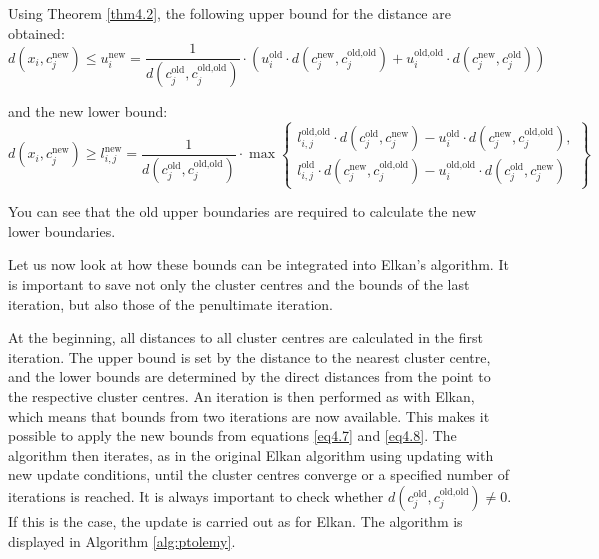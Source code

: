 Using Theorem \ref{thm4.2}, the following upper bound for the distance are obtained:
\begin{equation}
\label{eq4.7}
    d(x_i, c_j^{\text{new}}) \leq u_i^{\text{new}} = \frac{1}{d(c_j^{\text{old}}, c_j^{\text{old,old}})} \cdot \left( u_i^{\text{old}} \cdot d(c_j^{\text{new}}, c_j^{\text{old,old}}) + u_i^{\text{old,old}} \cdot d(c_j^{\text{new}}, c_j^{\text{old}}) \right)
\end{equation}

and the new lower bound:
\begin{equation}
\label{eq4.8}
    d(x_i, c_j^{\text{new}}) \geq l_{i,j}^{\text{new}} = \frac{1}{d(c_j^{\text{old}}, c_j^{\text{old,old}})} \cdot \max \left\{
        \begin{array}{l}
            l_{i,j}^{\text{old,old}} \cdot d(c_j^{\text{old}}, c_j^{\text{new}}) - u_i^{\text{old}} \cdot d(c_j^{\text{new}}, c_j^{\text{old,old}}), \\
            l_{i,j}^{\text{old}} \cdot d(c_j^{\text{new}}, c_j^{\text{old,old}}) - u_i^{\text{old,old}} \cdot d(c_j^{\text{old}}, c_j^{\text{new}})
        \end{array}
    \right\}
\end{equation}

You can see that the old upper boundaries are required to calculate the new lower boundaries.

Let us now look at how these bounds can be integrated into Elkan's algorithm. It is important to save not only the cluster centres and the bounds of the last iteration, but also those of the penultimate iteration.

At the beginning, all distances to all cluster centres are calculated in the first iteration. The upper bound is set by the distance to the nearest cluster centre, and the lower bounds are determined by the direct distances from the point to the respective cluster centres. An iteration is then performed as with Elkan, which means that bounds from two iterations are now available. This makes it possible to apply the new bounds from equations \ref{eq4.7} and \ref{eq4.8}. The algorithm then iterates, as in the original Elkan algorithm using updating with new update conditions, until the cluster centres converge or a specified number of iterations is reached. It is always important to check whether $d(c_j^{\text{old}}, c_j^{\text{old,old}}) \neq 0$. If this is the case, the update is carried out as for Elkan. The algorithm is displayed in Algorithm \ref{alg:ptolemy}.




